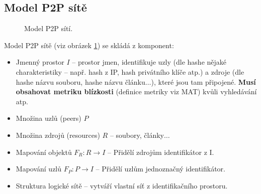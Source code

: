 \documentclass[11pt,a4paper]{article}
\begin{document}
\subsection{Model P2P sítě}
\begin{figure}[ht!]
\begin{center}
\caption{Model P2P sítí.}
\label{p2p_model}
\end{center}
\end{figure}
Model P2P sítě (viz obrázek \ref{p2p_model}) se skládá z komponent:
\begin{itemize}
\item Jmenný prostor $I$ -- prostor jmen, identifikuje uzly (dle hashe nějaké charakteristiky -- např. hash z IP, hash privátního klíče atp.) a zdroje (dle hashe názvu souboru, hashe názvu článku$\ldots$), které jsou tam připojené. \textbf{Musí obsahovat metriku blízkosti} (definice metriky viz MAT) kvůli vyhledávání atp.
\item Množina uzlů (peers) $P$
\item Množina zdrojů (resources) $R$ -- soubory, články$\ldots$
\item Mapování objektů $F_R : R \rightarrow I$ -- Přidělí zdrojům identifikátor z I.
\item Mapování uzlů $F_P : P \rightarrow I$ -- Přidělí uzlům jednoznačný identifikátor.
\item Struktura logické sítě -- vytváří vlastní síť z identifikačního prostoru.
\end{itemize}
\end{document}
